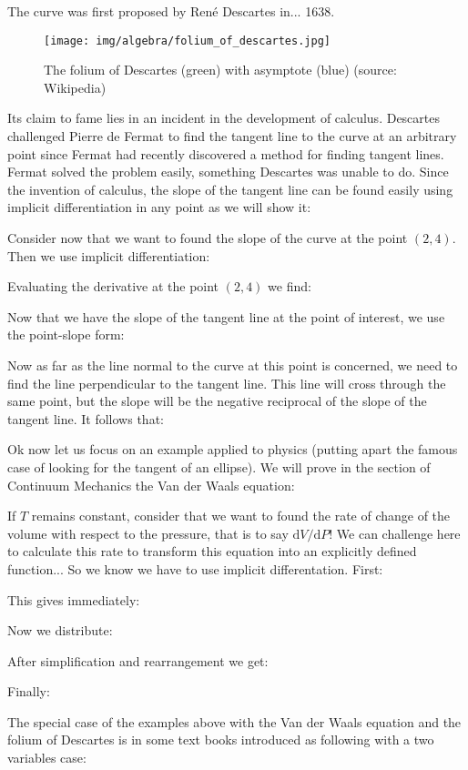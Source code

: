 	The curve was first proposed by René Descartes in... 1638.
	\begin{figure}[H]
		\centering
			\texttt{[image: img/algebra/folium\_of\_descartes.jpg]}
		\caption[The folium of Descartes with asymptote]{The folium of Descartes (green) with asymptote (blue) (source: Wikipedia)}
	\end{figure}
	Its claim to fame lies in an incident in the development of calculus. Descartes challenged Pierre de Fermat to find the tangent line to the curve at an arbitrary point since Fermat had recently discovered a method for finding tangent lines. Fermat solved the problem easily, something Descartes was unable to do. Since the invention of calculus, the slope of the tangent line can be found easily using implicit differentiation in any point as we will show it:
	
	Consider now that we want to found the slope of the curve at the point $(2,4)$. Then we use implicit differentiation: 
	
	Evaluating the derivative at the point $(2,4)$ we find:
	
	Now that we have the slope of the tangent line at the point of interest, we use the point-slope form:
	
	Now as far as the line normal to the curve at this point is concerned, we need to find the line perpendicular to the tangent line. This line will cross through the same point, but the slope will be the negative reciprocal of the slope of the tangent line. It follows that:
	
	
	Ok now let us focus on an example applied to physics (putting apart the famous case of looking for the tangent of an ellipse). We will prove in the section of Continuum Mechanics the Van der Waals equation:
	
	If $T$ remains constant, consider that we want to found the rate of change of the volume with respect to the pressure, that is to say $\mathrm{d}V/\mathrm{d}P$! We can challenge here to calculate this rate to transform this equation into an explicitly defined function... So we know we have to use implicit differentation. First:
	
	This gives immediately:
	
	Now we distribute:
	
	After simplification and rearrangement we get:
	
	Finally:
	
	The special case of the examples above with the Van der Waals equation and the folium of Descartes is in some text books introduced as following with a two variables case:
	
